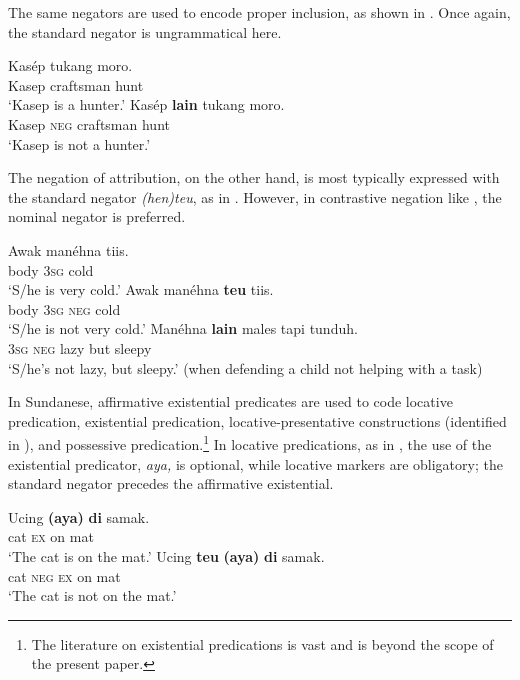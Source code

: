 \documentclass[output=paper]{langscibook}
\begin{document}
 The same negators are used to encode proper inclusion, as shown in . Once again, the standard negator is ungrammatical here. 

 
\ea\label{ex:sun:20}
    \ea\label{ex:sun:20a}
        \gll  Kasép tukang moro.\\ 
              Kasep craftsman hunt\\
        \glt ‘Kasep is a hunter.’
    \ex\label{ex:sun:20b}
        \gll  Kasép \textbf{lain} tukang moro. \\
              Kasep \textsc{neg} craftsman hunt\\
        \glt ‘Kasep is not a hunter.’ \citep[44]{Butters2021}
    \z
\z 

 The negation of attribution, on the other hand, is most typically expressed with the standard negator \textit{(hen)teu}, as in . However, in contrastive negation like , the nominal negator is preferred. 

 
\ea\label{ex:sun:21}
    \ea\label{ex:sun:21a}
        \gll  Awak manéhna tiis. \\ 
              body 3\textsc{sg} cold\\
        \glt ‘S/he is very cold.’
    \ex\label{ex:sun:21b}
        \gll  Awak manéhna \textbf{teu} tiis.\\
              body 3\textsc{sg} \textsc{neg} cold \\
        \glt ‘S/he is not very cold.’
    \ex\label{ex:sun:21c}
        \gll  Manéhna \textbf{lain} males tapi tunduh.\\
             3\textsc{sg} \textsc{neg} lazy but sleepy\\
        \glt ‘S/he’s not lazy, but sleepy.’ (when defending a child not helping with a task)
    \z
\z 

In Sundanese, affirmative existential predicates are used to code locative predication, existential predication, locative-presentative constructions (identified in \citealt{Veselinova2013neg.exist}), and possessive predication.\footnote{The literature on existential predications is vast and is beyond the scope of the present paper.} In locative predications, as in , the use of the existential predicator, \textit{aya,} is optional, while locative markers are obligatory; the standard negator precedes the affirmative existential. 

\ea\label{ex:sun:22}
    \ea\label{ex:sun:22a}
        \gll  Ucing \textbf{(aya)} \textbf{di} samak.\\ 
              cat \textsc{ex} on mat\\
        \glt ‘The cat is on the mat.’ 
    \ex\label{ex:sun:22b}
        \gll  Ucing \textbf{teu} \textbf{(aya)} \textbf{di} samak.\\
              cat \textsc{neg} \textsc{ex} on mat\\
        \glt ‘The cat is not on the mat.’
    \z
\z 
\end{document}
